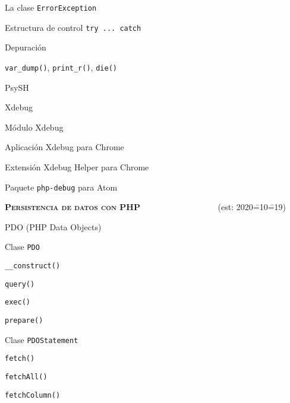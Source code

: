 \begin{longenum}
\begin{longenum}
\begin{longenum}
            \item La clase \texttt{ErrorException}
            \item Estructura de control \texttt{try ... catch}
        \end{longenum}
        \item Depuración
        \begin{longenum}
            \item \texttt{var\_dump()}, \texttt{print\_r()}, \texttt{die()}
            \item PsySH
            \item Xdebug \opcional\
            \begin{longenum}
                \item Módulo Xdebug
                \item Aplicación Xdebug para Chrome
                \item Extensión Xdebug Helper para Chrome
                \item Paquete \texttt{php-debug} para Atom
            \end{longenum}
        \end{longenum}
    \end{longenum}
    \item \textbf{\textsc{Persistencia de datos con PHP}} \ \ \ \ \ \ \ \ \ \ \ \ \ \ \ \ \ \ (est: 2020\==10\==19)
    \begin{longenum}
        \item PDO (PHP Data Objects)
        \begin{longenum}
            \item Clase \texttt{PDO}
            \begin{longenum}
                \item \texttt{\_\_construct()}
                \item \texttt{query()}
                \item \texttt{exec()}
                \item \texttt{prepare()}
            \end{longenum}
            \item Clase \texttt{PDOStatement}
            \begin{longenum}
                \item \texttt{fetch()}
                \item \texttt{fetchAll()}
                \item \texttt{fetchColumn()}

\end{longenum}
\end{longenum}
\end{longenum}
\end{longenum}
